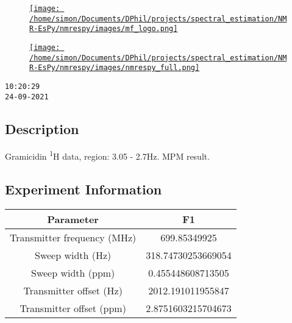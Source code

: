 \documentclass[8pt]{article}
\begin{document}
\begin{figure}[!ht]
\begin{minipage}[b][2.5cm][c]{.72\textwidth}
\href{http://foroozandeh.chem.ox.ac.uk/home}%
{\texttt{[image: /home/simon/Documents/DPhil/projects/spectral\_estimation/NMR-EsPy/nmrespy/images/mf\_logo.png]}}
\end{minipage}
\begin{minipage}[b][2.5cm][c]{.27\textwidth}
\href{https://foroozandehgroup.github.io/NMR-EsPy}%
{\texttt{[image: /home/simon/Documents/DPhil/projects/spectral\_estimation/NMR-EsPy/nmrespy/images/nmrespy\_full.png]}}
\end{minipage}
\end{figure}

\texttt{10:20:29\\24-09-2021}

\subsection*{Description}
Gramicidin \textsuperscript{{1}}H data, region: 3.05 - 2.7Hz. MPM result.

\subsection*{Experiment Information}
\hspace{-6pt}
\begin{longtable}[l]{c c}
\toprule
Parameter & F1
\\\midrule
Transmitter frequency (MHz) & 699.85349925\\
Sweep width (Hz) & 318.74730253669054\\
Sweep width (ppm) & 0.455448608713505\\
Transmitter offset (Hz) & 2012.191011955847\\
Transmitter offset (ppm) & 2.8751603215704673\\
\bottomrule
\end{longtable}

\end{document}
